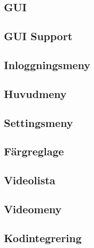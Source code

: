 \subsection{GUI}


\subsection{GUI Support}


\subsection{Inloggningsmeny}


\subsection{Huvudmeny}


\subsection{Settingsmeny}


\subsection{Färgreglage}


\subsection{Videolista}


\subsection{Videomeny}


\subsection{Kodintegrering} %
\label{sub:Kodintegrering}
